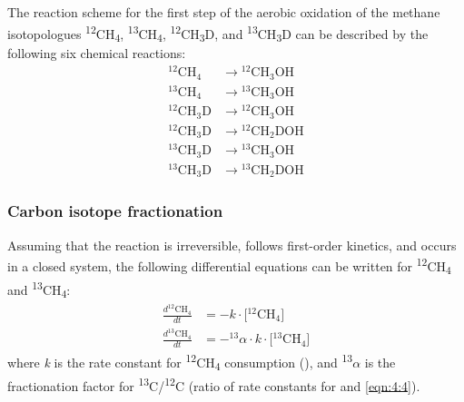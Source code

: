 The reaction scheme for the first step of the aerobic oxidation of the
methane isotopologues \textsuperscript{12}CH\textsubscript{4},
\textsuperscript{13}CH\textsubscript{4},
\textsuperscript{12}CH\textsubscript{3}D, and
\textsuperscript{13}CH\textsubscript{3}D can be described by the
following six chemical reactions:
\begin{align}
{}^{12}{\text{CH}}_4&\longrightarrow{}^{12}{\text{CH}}_3\text{OH} \label{eqn:4:4}\\
{}^{13}{\text{CH}}_4&\longrightarrow{}^{13}{\text{CH}}_3\text{OH} \label{eqn:4:5}\\
{}^{12}{\text{CH}}_3\text{D}&\longrightarrow{}^{12}{\text{CH}}_3\text{OH} \label{eqn:4:6}\\
{}^{12}{\text{CH}}_3\text{D}&\longrightarrow{}^{12}{\text{CH}}_2\text{DOH} \label{eqn:4:7}\\
{}^{13}{\text{CH}}_3\text{D}&\longrightarrow{}^{13}{\text{CH}}_3\text{OH} \label{eqn:4:8}\\
{}^{13}{\text{CH}}_3\text{D}&\longrightarrow{}^{13}{\text{CH}}_2\text{DOH} \label{eqn:4:9}
\end{align}

\subsubsection{Carbon isotope
	fractionation}\label{sec:4:carbon-isotope-fractionation}

Assuming that the reaction is irreversible, follows first-order
kinetics, and occurs in a closed system, the following differential
equations can be written for \textsuperscript{12}CH\textsubscript{4} and
\textsuperscript{13}CH\textsubscript{4}:
\begin{align}
\frac{d_{}^{\mathrm{12}}{\mathrm{C}\mathrm{H}_{\mathrm{4}}}}{{dt}} &= - k \cdot \bigl\lbrack{}_{}^{\mathrm{12}}{\mathrm{C}\mathrm{H}_{\mathrm{4}}} \bigr\rbrack \label{eqn:4:10} \\
\frac{d_{}^{\mathrm{13}}{\mathrm{C}\mathrm{H}_{\mathrm{4}}}}{{dt}} &= -_{}^{13}\alpha \cdot k \cdot \bigl\lbrack{}_{}^{\mathrm{13}}{\mathrm{C}\mathrm{H}_{\mathrm{4}}} \bigr\rbrack \label{eqn:4:11}
\end{align}
where \emph{k} is the rate constant for
\textsuperscript{12}CH\textsubscript{4} consumption (), and
\textsuperscript{13}$\alpha$ is the fractionation factor for
\textsuperscript{13}C/\textsuperscript{12}C (ratio of rate constants for
 and \ref{eqn:4:4}).


